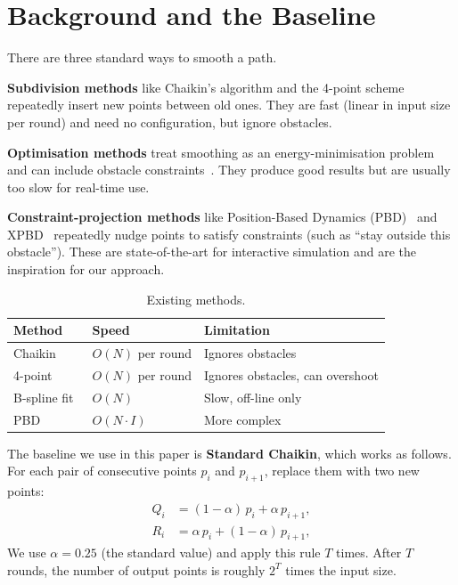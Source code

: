 \documentclass[10pt,a4paper,twocolumn]{article}
\begin{document}
\section{Background and the Baseline}

There are three standard ways to smooth a path.

\textbf{Subdivision methods} like Chaikin's algorithm and the
4-point scheme~\cite{dyn1987} repeatedly insert new points between old
ones. They are fast (linear in input size per round) and need no
configuration, but ignore obstacles.

\textbf{Optimisation methods} treat smoothing as an energy-minimisation
problem and can include obstacle constraints~\cite{ratliff2009}. They
produce good results but are usually too slow for real-time use.

\textbf{Constraint-projection methods} like Position-Based Dynamics
(PBD)~\cite{muller2007} and XPBD~\cite{macklin2016} repeatedly nudge
points to satisfy constraints (such as ``stay outside this obstacle'').
These are state-of-the-art for interactive simulation and are the
inspiration for our approach.

\begin{table}[t]\centering
\caption{Existing methods.}\label{tab:baseline}\small
\begin{tabular}{@{}p{}p{}p{}@{}}
\toprule
\textbf{Method} & \textbf{Speed} & \textbf{Limitation} \\
\midrule
Chaikin~\cite{chaikin1974}     & $O(N)$ per round & Ignores obstacles \\
4-point~\cite{dyn1987}         & $O(N)$ per round & Ignores obstacles, can overshoot \\
B-spline fit~\cite{boehm1980} & $O(N)$ & Slow, off-line only \\
PBD~\cite{muller2007}          & $O(N\!\cdot\!I)$ & More complex \\
\bottomrule
\end{tabular}
\end{table}

The baseline we use in this paper is \textbf{Standard Chaikin}, which
works as follows. For each pair of consecutive points $p_i$ and
$p_{i+1}$, replace them with two new points:
\begin{equation}
\begin{aligned}
Q_i &= (1-\alpha)\,p_i + \alpha\,p_{i+1}, \\
R_i &= \alpha\,p_i + (1-\alpha)\,p_{i+1},
\end{aligned}
\label{eq:chaikin}
\end{equation}
We use $\alpha = 0.25$ (the standard value) and apply this rule $T$
times. After $T$ rounds, the number of output points is roughly
$2^T$ times the input size.
\end{document}
